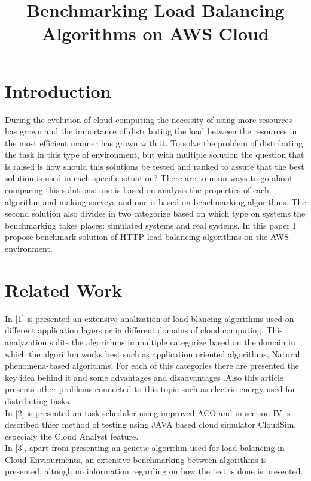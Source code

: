 \documentclass[conference]{IEEEtran}
\newcommand\tab[1][.3cm]{\hspace*{#1}}
\begin{document}
\title{Benchmarking Load Balancing Algorithms on AWS Cloud\\}

\author{}

\maketitle

\section{Introduction}
During the evolution of cloud computing the necessity of using more resources has grown and the importance of distributing the load between the resources in the most efficient manner has grown with it. To solve the problem of distributing the task in this type of environment, but with multiple solution the question that is raised is how should this solutions be tested and ranked to assure that the best solution is used in each specific situation? There are to main ways to go about comparing this solutions: one is based on analysis the properties of each algorithm and making surveys and one is based on benchmarking algorithms. The second solution also divides in two categorize based on which type on systems the benchmarking takes places: simulated systems and real systems. In this paper I propose benchmark solution of HTTP load balancing algorithms on the AWS environment. 

\section{Related Work}
In [1] is presented an extensive analization of load blancing algorithms used on different application layers or in different domains of cloud computing. This analyzation splits the algorithms in multiple categorize based on the domain in which the algorithm works best such as application oriented algorithms, Natural phenomena-based algorithms. For each of this categories there are presented the key idea behind it and some advantages and disadvantages .Also this article presents other problems connected to this topic such as electric energy used for distributing tasks.  
\\ \tab In [2] is presented an task scheduler using improved ACO and in section IV is described thier method of testing using JAVA based cloud simulator CloudSim, especialy the Cloud Analyst feature. 
\\ \tab In [3], apart from presenting an genetic algorithm used for load balancing in Cloud Enviourments, an extensive benchmarking between algorithms is presented, altough no information regarding on how the test is done is presented.
\end{document}
